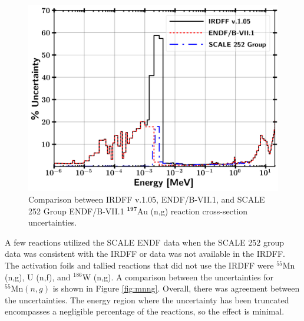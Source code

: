 \begin{figure}[hbt!]
	\centering
	\includegraphics[width=13cm]{Figures/Chapter3/Au_ng_Uncertainty.png}
	\caption[Comparison between IRDFF v.1.05, ENDF/B-VII.1, and SCALE 252 Group ENDF/B-VII.1 $\mathrm{^{197}}$Au (n,g) reaction cross-section uncertainties.]{Comparison between IRDFF v.1.05, ENDF/B-VII.1, and SCALE 252 Group ENDF/B-VII.1 $\mathbf{^{197}}$Au (n,g) reaction cross-section uncertainties.}
	\label{fig:aung}
\end{figure}

A few reactions utilized the SCALE ENDF data when the SCALE 252 group data was consistent with the IRDFF or data was not available in the IRDFF. 
The activation foils and tallied reactions that did not use the IRDFF were $\mathrm{^{55}}$Mn (n,g), U  (n,f), and $\mathrm{^{186}}$W (n,g). 
A comparison between the uncertainties for $\mathrm{^{55}Mn} (n,g)$ is shown in Figure \ref{fig:mnng}. 
Overall, there was agreement between the uncertainties. 
The energy region where the uncertainty has been truncated encompasses a negligible percentage of the reactions, so the effect is minimal. 

